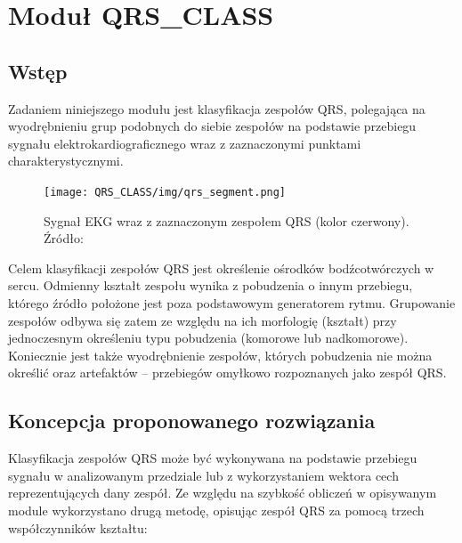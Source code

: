 \section{Moduł QRS\_CLASS}

\subsection{Wstęp}
Zadaniem niniejszego modułu jest klasyfikacja zespołów QRS, polegająca na wyodrębnieniu grup podobnych do siebie zespołów na podstawie przebiegu sygnału elektrokardiograficznego wraz z zaznaczonymi punktami charakterystycznymi.\newline
\begin{figure}[h]
\centering
\texttt{[image: QRS\_CLASS/img/qrs\_segment.png]}
\caption{Sygnał EKG wraz z zaznaczonym zespołem QRS (kolor czerwony). Źródło: \cite{QRS_MedicalDictionary}}
\label{fig:QRS_Segment}
\end{figure}
\newline Celem klasyfikacji zespołów QRS jest określenie ośrodków bodźcotwórczych w sercu. Odmienny kształt zespołu wynika z pobudzenia o innym przebiegu, którego źródło położone jest poza podstawowym generatorem rytmu. Grupowanie zespołów odbywa się zatem ze względu na ich morfologię (kształt) przy jednoczesnym określeniu typu pobudzenia (komorowe lub nadkomorowe). Koniecznie jest także wyodrębnienie zespołów, których pobudzenia nie można określić oraz artefaktów – przebiegów omyłkowo rozpoznanych jako zespół QRS.\newpage

\subsection{Koncepcja proponowanego rozwiązania}
Klasyfikacja zespołów QRS może być wykonywana na podstawie przebiegu sygnału w analizowanym przedziale lub z wykorzystaniem wektora cech reprezentujących dany zespół. Ze względu na szybkość obliczeń w opisywanym module wykorzystano drugą metodę, opisując zespół QRS za pomocą trzech współczynników kształtu:

